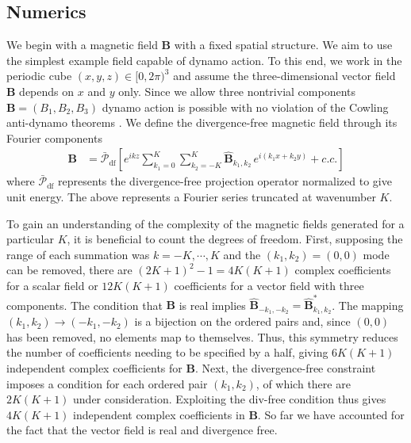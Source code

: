 \documentclass[onecolumn,showpacs,preprintnumbers,amsmath,amssymb]{revtex4-2}
\newcommand{\nick}[1]{{\color{orange}#1}}
\newcommand{\bvec}[1]{{\mathbf{#1}}}
\newcommand{\Bvec}{\bvec{B}}
\newcommand{\nproj}{ \bar{\mathcal{P}}_{\text{df}} }
\newcommand{\eikx}{e^{ i \left( k_1 x + k_2 y \right) }}
\begin{document}
\subsection{Numerics}

We begin with a magnetic field $\Bvec$ with a fixed spatial structure. We aim to use the simplest example field capable of dynamo action.
To this end, we work in the periodic cube $(x,y,z) \in [0, 2\pi)^3$ and assume the three-dimensional vector field $\Bvec$ depends  on $x$ and $y$ only. Since we allow three nontrivial components $\Bvec = (B_1, B_2, B_3)$ dynamo action is possible with no violation of the Cowling anti-dynamo theorems \cite{Moffatt2019}. We define the divergence-free magnetic field through its Fourier components 
\begin{align}
\label{B_Fourier}
\Bvec &= \nproj \left[ e^{i k z}
\sum_{k_1=0}^{K} \sum_{k_2=-K}^{K}
\hat{\Bvec}_{k_1, k_2} \, \eikx + c.c. \right]
\end{align}
where $\nproj$ represents the divergence-free projection operator normalized to give unit energy.
The above represents a Fourier series truncated at wavenumber $K$.


To gain an understanding of the complexity of the magnetic fields generated for a particular $K$, it is beneficial to count the degrees of freedom. First, supposing the range of each summation was $k=-K,\cdots,K$ and the $(k_1,k_2)=(0,0)$ mode can be removed, there are $(2K+1)^2-1 = 4K(K+1)$ complex coefficients for a scalar field or $12K(K+1)$ coefficients for a vector field with three components. The condition that $\Bvec$ is real implies $\hat{\Bvec}_{-k_1,-k_2} = \hat{\Bvec}_{k_1,k_2}^*$. The mapping $(k_1,k_2) \to (-k_1,-k_2)$ is a bijection on the ordered pairs and, since $(0,0)$ has been removed, no elements map to themselves. Thus, this symmetry reduces the number of coefficients needing to be specified by a half, giving $6K(K+1)$ independent complex coefficients for $\Bvec$. Next, the divergence-free constraint imposes a condition for each ordered pair $(k_1,k_2)$, of which there are $2K(K+1)$ under consideration. Exploiting the div-free condition thus gives $4K(K+1)$ independent complex coefficients in $\Bvec$. So far we have accounted for the fact that the vector field is real and divergence free.
\end{document}
